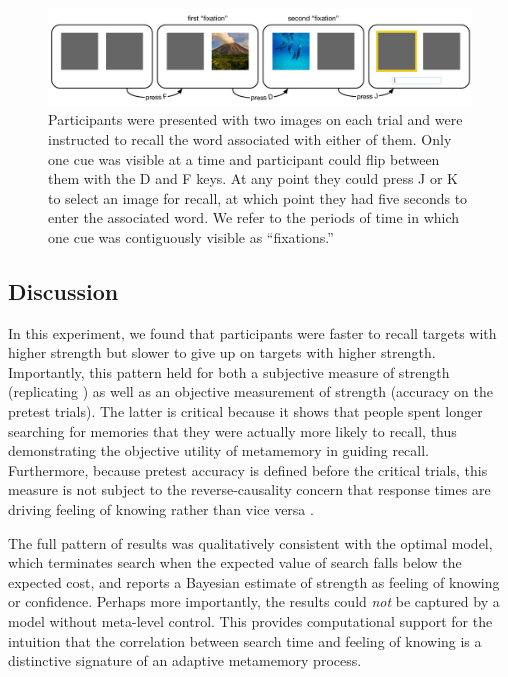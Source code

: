 \begin{figure}[t!]
  \centering
  \includegraphics[width=\textwidth]{figs/memory/task_exp2.pdf}
  \caption{ Participants were presented with two images on each trial and were instructed to recall the word associated with either of them. Only one cue was visible at a time and participant could flip between them with the D and F keys. At any point they could press J or K to select an image for recall, at which point they had five seconds to enter the associated word. We refer to the periods of time in which one cue was contiguously visible as ``fixations.''}
  \label{fig:task-exp2}
\end{figure}

\subsection{Discussion}

In this experiment, we found that participants were faster to recall targets with higher strength but slower to give up on targets with higher strength. Importantly, this pattern held for both a subjective measure of strength (replicating \citealp{costermans1992confidence}) as well as an objective measurement of strength (accuracy on the pretest trials). The latter is critical because it shows that people spent longer searching for memories that they were actually more likely to recall, thus demonstrating the objective utility of metamemory in guiding recall. Furthermore, because pretest accuracy is defined before the critical trials, this measure is not subject to the reverse-causality concern that response times are driving feeling of knowing rather than vice versa \citep{schwartz2001relation}. 

The full pattern of results was qualitatively consistent with the optimal model, which terminates search when the expected value of search falls below the expected cost, and reports a Bayesian estimate of strength as feeling of knowing or confidence. Perhaps more importantly, the results could \emph{not} be captured by a model without meta-level control. This provides computational support for the intuition that the correlation between search time and feeling of knowing is a distinctive signature of an adaptive metamemory process.


